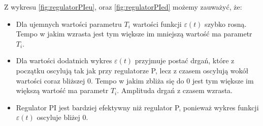 \documentclass[a4paper,10pt]{article}
\begin{document}
\newpage Z wykresu \ref{fig:regulatorPIeu}, oraz \ref{fig:regulatorPIed} możemy zauważyć, że:
\begin{itemize}
	\item Dla ujemnych wartości parametru $T_{i}$ wartości funkcji $\varepsilon(t)$ szybko rosną. Tempo w jakim wzrasta jest tym większe im mniejszą wartość ma parametr $T_{i}$.
	\item Dla wartości dodatnich wykres $\varepsilon(t)$ przyjmuje postać drgań, które z początku oscylują tak jak przy regulatorze P, lecz z czasem oscylują wokół wartości coraz bliższej 0. Tempo w jakim zbliża się do 0 jest tym większe im większą wartość ma parametr $T_{i}$. Amplituda drgań z czasem wzrasta.
	\item Regulator PI jest bardziej efektywny niż regulator P, ponieważ wykres funkcji $\varepsilon(t)$ oscyluje bliżej 0.
\end{itemize}
\end{document}
